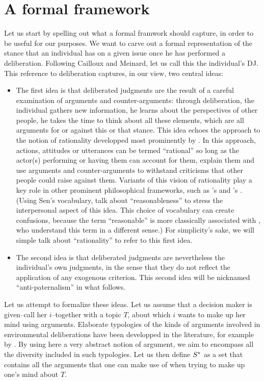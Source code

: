 \documentclass[version=last, pagesize, twoside=off, bibliography=totoc, DIV=calc, fontsize=14pt, a4paper, french, english]{scrartcl}
\begin{document}
\section{A formal framework}
Let us start by spelling out what a formal framwork should capture, in order to be useful for our purposes. We want to carve out a formal representation of the stance that an individual has on a given issue once he has performed a deliberation. Following Cailloux and Meinard, let us call this the individual's \ac{DJ}. This reference to deliberation captures, in our view, two central ideas:
\begin{itemize}
\item The first idea is that deliberated judgments are the result of a careful examination of arguments and counter-arguments: through deliberation, the individual gathers new information, he learns about the perspectives of other people, he takes the time to think about all these elements, which are all arguments for or against this or that stance. This idea echoes the approach to the notion of rationality developped most prominently by \citet{habermas_theorie_1981}. In this approach, actions, attitudes or utterances can be termed “rational” so long as the actor(s) performing or having them can account for them, explain them and use arguments and counter-arguments to withstand criticisms that other people could raise against them. Variants of this vision of rationality play a key role in other prominent philosophical frameworks, such as \citeauthor{scanlon_what_2000}’s \citeyearpar{scanlon_what_2000} and \citeauthor{sen_idea_2009}’s \citeyearpar{sen_idea_2009}. (Using Sen's vocabulary, \citet{bartkowski_beyond_2018} talk about ``reasonableness'' to stress the interpersonal aspect of this idea. This choice of vocabulary can create confusions, because the term ``reasonable'' is more classically associated with \citet{rawls_political_2005}, who understand this term in a different sense.) For simplicity's sake, we will simple talk about ``rationality'' to refer to this first idea.
\item The second idea is that deliberated judgments are nevertheless the individual's own judgments, in the sense that they do not reflect the application of any exogenous criterion. This second idea will be nicknamed ``anti-paternalism'' in what follows.
\end{itemize}

Let us attempt to formalize these ideas. Let us assume that a decision maker is given--call her $i$--together with a topic $T$, about which $i$ wants to make up her mind using arguments. Elaborate typologies of the kinds of arguments involved in environmental deliberations have been developped in the literature, for example by \citet{chateauraynaud_contrainte_2007}. By using here a very abstract notion of argument, we aim to encompass all the diversity included in such typologies. Let us then define $S^*$ as a set that contains all the arguments that one can make use of when trying to make up one’s mind about $T$.
\end{document}
